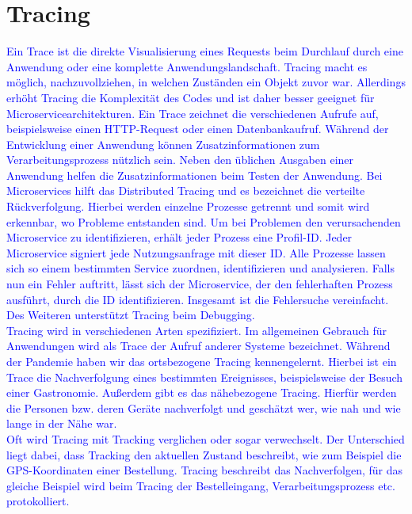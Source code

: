 \section{Tracing}\label{sec:tracing}
\textcolor{blue}{
    Ein Trace ist die direkte Visualisierung eines Requests beim Durchlauf durch eine Anwendung oder eine komplette Anwendungslandschaft.
    Tracing macht es möglich, nachzuvollziehen, in welchen Zuständen ein Objekt zuvor war.
    Allerdings erhöht Tracing die Komplexität des Codes und ist daher besser geeignet für Microservicearchitekturen.
    Ein Trace zeichnet die verschiedenen Aufrufe auf, beispielsweise einen HTTP-Request oder einen Datenbankaufruf.
    Während der Entwicklung einer Anwendung können Zusatzinformationen zum Verarbeitungsprozess nützlich sein.
    Neben den üblichen Ausgaben einer Anwendung helfen die Zusatzinformationen beim Testen der Anwendung.
    Bei Microservices hilft das Distributed Tracing und es bezeichnet die verteilte Rückverfolgung.
    Hierbei werden einzelne Prozesse getrennt und somit wird erkennbar, wo Probleme entstanden sind.
    Um bei Problemen den verursachenden Microservice zu identifizieren, erhält jeder Prozess eine Profil-ID.
    Jeder Microservice signiert jede Nutzungsanfrage mit dieser ID.
    Alle Prozesse lassen sich so einem bestimmten Service zuordnen, identifizieren und analysieren.
    Falls nun ein Fehler auftritt, lässt sich der Microservice, der den fehlerhaften Prozess ausführt, durch die ID identifizieren.
    Insgesamt ist die Fehlersuche vereinfacht.
    Des Weiteren unterstützt Tracing beim Debugging.
    \\
    Tracing wird in verschiedenen Arten spezifiziert.
    Im allgemeinen Gebrauch für Anwendungen wird als Trace der Aufruf anderer Systeme bezeichnet.
    Während der Pandemie haben wir das ortsbezogene Tracing kennengelernt.
    Hierbei ist ein Trace die Nachverfolgung eines bestimmten Ereignisses, beispielsweise der Besuch einer Gastronomie.
    Außerdem gibt es das nähebezogene Tracing.
    Hierfür werden die Personen bzw. deren Geräte nachverfolgt und geschätzt wer, wie nah und wie lange in der Nähe war.
    \\
    Oft wird Tracing mit Tracking verglichen oder sogar verwechselt.
    Der Unterschied liegt dabei, dass Tracking den aktuellen Zustand beschreibt, wie zum Beispiel die GPS-Koordinaten einer Bestellung.
    Tracing beschreibt das Nachverfolgen, für das gleiche Beispiel wird beim Tracing der Bestelleingang, Verarbeitungsprozess etc. protokolliert.
}\autocite{adesso, monstarlab}


